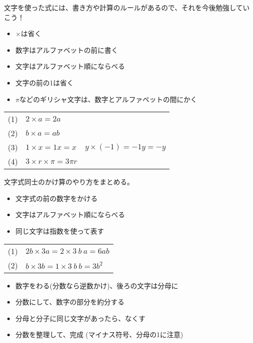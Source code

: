 \documentclass[11pt]{article}
\begin{document}
文字を使った式には、書き方や計算のルールがあるので、それを今後勉強していこう！\\

\begin{tcolorbox}[mybox={文字式の書き方のルール}]
\begin{itemize}
\item $\times$は省く
\item 数字はアルファベットの前に書く
\item 文字はアルファベット順にならべる
\item 文字の前の1は省く
\item $\pi$などのギリシャ文字は、数字とアルファベットの間にかく
\end{itemize}
\end{tcolorbox}


\begin{tabular}{llr}
(1) & $2 \times a = 2a$ & \\
(2) & $b \times a = ab$ &\\
(3) & $1 \times x = 1x =x$ & \hspace{2cm} $y \times (-1) = -1y =-y$ \\
(4) & $3 \times r \times \pi = 3\pi r$ &\\
\end{tabular}


\begin{tcolorbox}[mybox={文字式の積}]
文字式同士のかけ算のやり方をまとめる。
\begin{itemize}
\item 文字式の前の数字をかける
\item 文字はアルファベット順にならべる
\item 同じ文字は指数を使って表す
\end{itemize}
\end{tcolorbox}


\begin{tabular}{ll}
(1) & $2b \times 3a = 2 \times 3 \ b \ a = 6 ab$\\
(2) & $b \times 3b = 1 \times 3\ b \  b = 3b^2$\\
\end{tabular}

\begin{tcolorbox}[mybox={文字式の商}]
\begin{itemize}
\item 数字をわる(分数なら逆数かけ)、後ろの文字は分母に
\item 分数にして、数字の部分を約分する
\item 分母と分子に同じ文字があったら、なくす
\item 分数を整理して、完成 (マイナス符号、分母の1に注意)
\end{itemize}
\end{tcolorbox}
\end{document}
